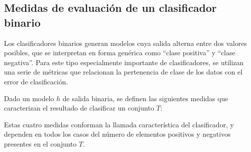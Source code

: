%
%
\subsection{Medidas de evaluación de un clasificador binario}
%
Los clasificadores binarios generan modelos cuya salida alterna
entre dos valores posibles, que se interpretan en forma genérica
como ``clase positiva'' y ``clase negativa''.
Para este tipo especialmente
importante de clasificadores, se utilizan una serie de métricas que
relacionan la pertenencia de clase de los datos con el
error de clasificación.

Dado un modelo $h$ de salida binaria, se definen las siguientes
medidas que caracterizan el resultado de clasificar un conjunto $T$:
%
\iflatexml{}
%
Estas cuatro medidas conforman la llamada 
característica del clasificador, y dependen en todos los casos del
número de elementos positivos y negativos presentes en el conjunto
$T$.
